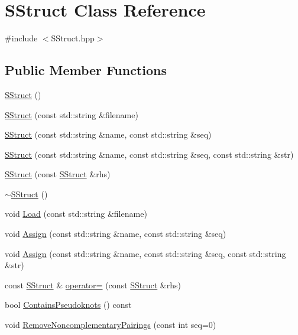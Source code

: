 \hypertarget{class_s_struct}{\section{S\+Struct Class Reference}
\label{class_s_struct}
}


{\ttfamily \#include $<$S\+Struct.\+hpp$>$}

\subsection*{Public Member Functions}
\begin{DoxyCompactItemize}
\item 
\hyperlink{class_s_struct_a58ee9a2053b13b24116b6a47be23e82f}{S\+Struct} ()
\item 
\hyperlink{class_s_struct_ae80ebc2151d3d69bdb8c0c6c062bbef1}{S\+Struct} (const std\+::string \&filename)
\item 
\hyperlink{class_s_struct_ad1c01bd81866307b6599483581ac55b9}{S\+Struct} (const std\+::string \&name, const std\+::string \&seq)
\item 
\hyperlink{class_s_struct_a4aa6cec1d329227ea7eb06dbd18fd3cd}{S\+Struct} (const std\+::string \&name, const std\+::string \&seq, const std\+::string \&str)
\item 
\hyperlink{class_s_struct_ac9dba145eeade69038b9f29cbc1ca7b5}{S\+Struct} (const \hyperlink{class_s_struct}{S\+Struct} \&rhs)
\item 
\hyperlink{class_s_struct_aef472f81f252999a8fa9d8f56c6026e2}{$\sim$\+S\+Struct} ()
\item 
void \hyperlink{class_s_struct_ab75b5c5dead14ed6112a04381af060fe}{Load} (const std\+::string \&filename)
\item 
void \hyperlink{class_s_struct_a661fc1833eccb901e361b644c756c2c1}{Assign} (const std\+::string \&name, const std\+::string \&seq)
\item 
void \hyperlink{class_s_struct_af2e8d0fd6505afb35134b9c33a37d82f}{Assign} (const std\+::string \&name, const std\+::string \&seq, const std\+::string \&str)
\item 
const \hyperlink{class_s_struct}{S\+Struct} \& \hyperlink{class_s_struct_a53ba7a38776b355ec1c7f511b762d112}{operator=} (const \hyperlink{class_s_struct}{S\+Struct} \&rhs)
\item 
bool \hyperlink{class_s_struct_a9126b795a3aac062ea5ddea558f31650}{Contains\+Pseudoknots} () const 
\item 
void \hyperlink{class_s_struct_adf88a89b209e7a409d209e8342185468}{Remove\+Noncomplementary\+Pairings} (const int seq=0)

\end{DoxyCompactItemize}
